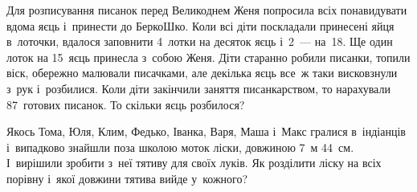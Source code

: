 \problem
Для розписування писанок перед Великоднем Женя попросила всіх понавидувати
вдома яєць і~принести до БеркоШко. Коли всі діти поскладали принесені яйця
в~лоточки, вдалося заповнити 4~лотки на десяток яєць і~2~--- на~18.
Ще один лоток на 15~яєць принесла з~собою Женя.
Діти старанно робили писанки, топили віск, обережно малювали писачками,
але декілька яєць все~ж таки висковзнули з~рук і~розбилися.
Коли діти закінчили заняття писанкарством, то нарахували 87~готових писанок.
То скільки яєць розбилося?


\problem
Якось Тома, Юля, Клим, Федько, Іванка, Варя, Маша і~Макс гралися
в~індіанців і~випадково знайшли поза школою моток ліски, довжиною 7~м 44~см.
І~вирішили зробити з~неї тятиву для своїх луків.
Як розділити ліску на всіх порівну і~якої довжини тятива вийде у~кожного?
